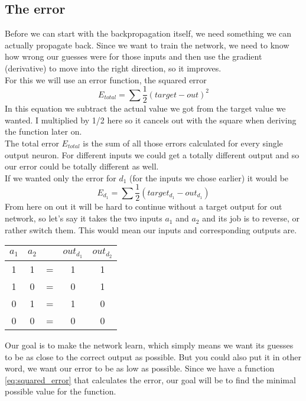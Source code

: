 \documentclass[11pt, halfparskip]{article}
\begin{document}
     \subsection{The error}
     \label{sec:the:error}
     Before we can start with the backpropagation itself, we need something we can actually propagate back. Since we want to train the network, we need to know how wrong our
     guesses were for those inputs and then use the gradient (derivative) to move into the right direction, so it improves.\\
     For this we will use an error function, the squared error 
     \begin{equation} 
     \label{eq:squared_error}
     	E_{total} = \sum \frac{1}{2}(target - out)^2
    \end{equation}
    In this equation we subtract the actual value we got from the target value we wanted. I multiplied by 1/2 here so it cancels out with the square when deriving the function later on.\\
    The total error $E_{total}$ is the sum of all those errors calculated for every single output neuron. For different inputs we could get a totally different output and so our error could 
    be totally different as well. \\
    If we wanted only the error for $d_1$ (for the inputs we chose earlier) it would be 
    \[
    	E_{d_1} = \sum \frac{1}{2}(target_{d_1} - out_{d_1})
    \]
    From here on out it will be hard to continue without a target output for out network, so let's say it takes the two inputs $a_1$ and $a_2$ and its job is to reverse, or rather switch
    them. This would mean our inputs and corresponding outputs are.
    \begin{center}
	    \begin{tabular}{c c c c c}
	    	$a_1$ & $a_2$ &  & $out_{d_1}$ & $out_{d_2}$\\
    		\hline
	    	1 & 1 & = & 1 & 1\\
    		1 & 0 & = & 0 & 1\\
	    	0 & 1 & = & 1 & 0\\
    		0 & 0 & = & 0 & 0
    	\end{tabular}
    \end{center}
    
    \noindent \newline
    Our goal is to make the network learn, which simply means we want its guesses to be as close to the correct output as possible. But you could also put it in other word, we want our
    error to be as low as possible. Since we have a function \ref{eq:squared_error} that calculates the error, our goal will be to find the minimal possible value for the function.\\
    
\end{document}

